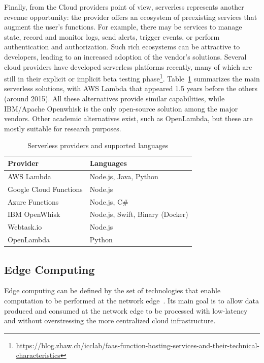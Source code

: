 Finally, from the Cloud providers point of view, serverless represents another revenue opportunity: the provider offers an ecosystem of preexisting services that augment the user's functions. For example, there may be services to manage state, record and monitor logs, send alerts, trigger events, or perform authentication and authorization. Such rich ecosystems can be attractive to developers, leading to an increased adoption of the vendor's solutions. Several cloud providers have developed serverless platforms recently, many of which are still in their explicit or implicit beta testing phase\footnote{\url{https://blog.zhaw.ch/icclab/faas-function-hosting-services-and-their-technical-characteristics}}. Table~\ref{tab:FaaS-providers-and} summarizes the main serverless solutions, with AWS Lambda that appeared 1.5 years before the others (around 2015). All these alternatives provide similar capabilities, while IBM/Apache Openwhisk is the only open-source solution among the major vendors. Other academic alternatives exist, such as OpenLambda\cite{hendrickson2016serverless}, but these are mostly suitable for research purposes.

\begin{table}[hbt]
\centering
\caption{Serverless providers and supported languages\label{tab:FaaS-providers-and}}{
\begin{tabular}{ll}
\toprule 
\textbf{Provider} & \textbf{Languages}\tabularnewline
\midrule
AWS Lambda & Node.js, Java, Python\tabularnewline
Google Cloud Functions & Node.js\tabularnewline
Azure Functions & Node.js, C\#\tabularnewline
IBM OpenWhisk & Node.js, Swift, Binary (Docker)\tabularnewline
Webtask.io & Node.js\tabularnewline
OpenLambda & Python\tabularnewline
\bottomrule
\end{tabular}}
\end{table}



\subsection{Edge Computing}

Edge computing can be defined by the set of technologies that enable computation to be performed at the network edge~\cite{Shi:2016}. Its main goal is to allow data produced and consumed at the network edge to be processed with low-latency and without overstressing the more centralized cloud infrastructure.


